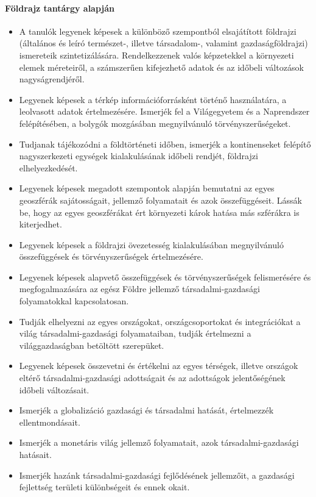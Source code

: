 \paragraph{Földrajz tantárgy alapján}
\begin{itemize}
\item A tanulók legyenek képesek a különböző szempontból elsajátított földrajzi (általános és leíró természet-, illetve társadalom-, valamint gazdaságföldrajzi) ismereteik szintetizálására. Rendelkezzenek valós képzetekkel a környezeti elemek méreteiről, a számszerűen kifejezhető adatok és az időbeli változások nagyságrendjéről.
\item Legyenek képesek a térkép információforrásként történő használatára, a leolvasott adatok értelmezésére. Ismerjék fel a Világegyetem és a Naprendszer felépítésében, a bolygók mozgásában megnyilvánuló törvényszerűségeket.
\item Tudjanak tájékozódni a földtörténeti időben, ismerjék a kontinenseket felépítő nagyszerkezeti egységek kialakulásának időbeli rendjét, földrajzi elhelyezkedését.
\item Legyenek képesek megadott szempontok alapján bemutatni az egyes geoszférák sajátosságait, jellemző folyamatait és azok összefüggéseit. Lássák be, hogy az egyes geoszférákat ért környezeti károk hatása más szférákra is kiterjedhet.
\item Legyenek képesek a földrajzi övezetesség kialakulásában megnyilvánuló összefüggések és törvényszerűségek értelmezésére.
\item Legyenek képesek alapvető összefüggések és törvényszerűségek felismerésére és megfogalmazására az egész Földre jellemző társadalmi-gazdasági folyamatokkal kapcsolatosan.
\item Tudják elhelyezni az egyes országokat, országcsoportokat és integrációkat a világ társadalmi-gazdasági folyamataiban, tudják értelmezni a világgazdaságban betöltött szerepüket.
\item Legyenek képesek összevetni és értékelni az egyes térségek, illetve országok eltérő társadalmi-gazdasági adottságait és az adottságok jelentőségének időbeli változásait.
\item Ismerjék a globalizáció gazdasági és társadalmi hatását, értelmezzék ellentmondásait.
\item Ismerjék a monetáris világ jellemző folyamatait, azok társadalmi-gazdasági hatásait.
\item Ismerjék hazánk társadalmi-gazdasági fejlődésének jellemzőit, a gazdasági fejlettség területi különbségeit és ennek okait.

\end{itemize}

